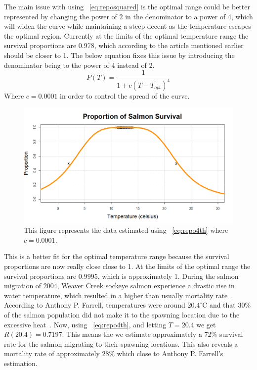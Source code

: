 The main issue with using \equationautorefname~\eqref{eq:reposquared} is the optimal range could be better represented by changing the power of 2 in the denominator to a power of 4, which will widen the curve while maintaining a steep decent as the temperature escapes the optimal region. Currently at the limits of the optimal temperature range the survival proportions are $0.978$, which according to the article mentioned earlier should be closer to 1. The below equation fixes this issue by introducing the denominator being to the power of 4 instead of 2.
\begin{equation}\label{eq:repo4th}
    P(T) = \frac{1}{1+c(T-T_{opt})^4}
\end{equation}
Where $c=0.0001$ in order to control the spread of the curve.

\begin{figure}[H]
    \centering
    \includegraphics[width=14cm]{Pictures/Salmon Pop/salmon repo model/repo curve 4.png}
    \caption{This figure represents the data estimated using \equationautorefname~\eqref{eq:repo4th} where $c=0.0001$.}
    \label{fig:reporductioncurve4}
\end{figure}
This is a better fit for the optimal temperature range because the survival proportions are now really close close to 1. 
At the limits of the optimal range the survival proportions are $0.9995$, which is approximately 1.
During the salmon migration of 2004, Weaver Creek sockeye salmon experience a drastic rise in water temperature, which resulted in a higher than usually mortality rate~\cite{farrell2008pacific}.
According to Anthony P. Farrell, temperatures were around $20.4^{\circ}$C and that 30\% of the salmon population did not make it to the spawning location due to the excessive heat~\cite{farrell2008pacific}.
Now, using \equationautorefname~\eqref{eq:repo4th}, and letting $T=20.4$ we get $R(20.4)=0.7197$.
This means the we estimate approximately a 72\% survival rate for the salmon migrating to their spawning locations.
This also reveals a mortality rate of approximately 28\% which close to Anthony P. Farrell's estimation.

